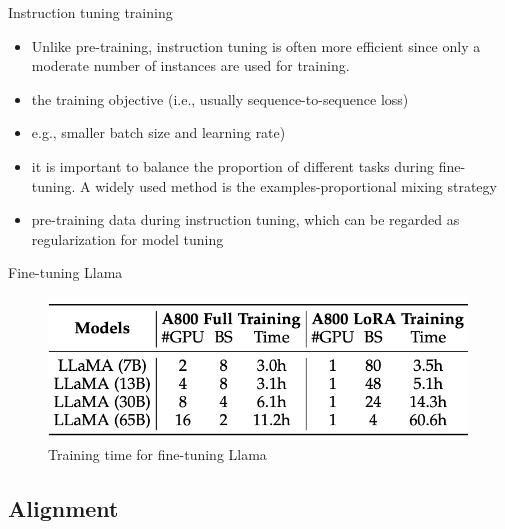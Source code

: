 \documentclass[10pt]{beamer}
\begin{document}
\begin{frame}{Instruction tuning training}

\begin{itemize}
\item Unlike pre-training, instruction tuning is often more efficient since only a moderate number of instances are used for training.
\item the training objective (i.e., usually sequence-to-sequence loss)
\item e.g., smaller batch size and learning rate)
\item it is important to balance the proportion of different tasks during fine- tuning. A widely used method is the examples-proportional mixing strategy
\item pre-training data during instruction tuning, which can be regarded as regularization for model tuning
\end{itemize}

\end{frame}

\begin{frame}{Fine-tuning Llama}

\begin{figure}[h]
\centering
\includegraphics[width=0.99\textwidth]{fig/zhao_2023_tab7}
\caption{Training time for fine-tuning Llama}
\end{figure}

\end{frame}


\subsection{Alignment}
\end{document}
